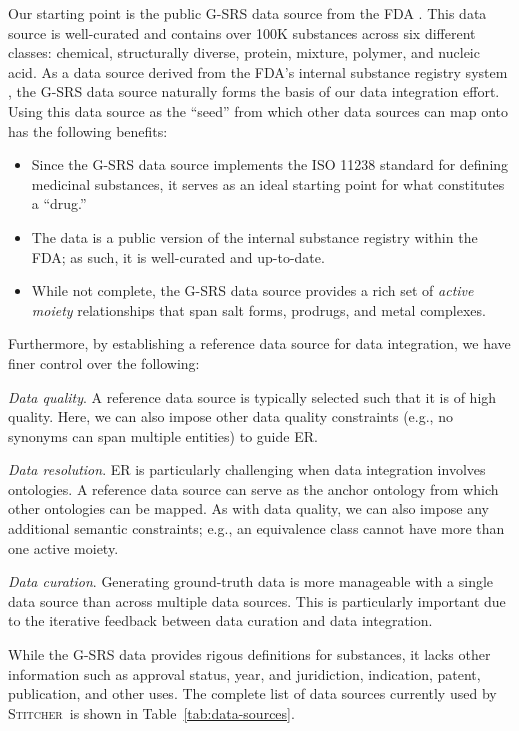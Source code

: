 \documentclass{bmcart}
\newcommand\st{\textsc{Stitcher}}
\begin{document}
Our starting point is the public G-SRS data source from the FDA
\cite{GSRSData}. This data source is well-curated and contains over
100K substances across six different classes: chemical, structurally
diverse, protein, mixture, polymer, and nucleic acid. As 
a data source derived from the FDA's internal substance registry
system \cite{GSRS}, the G-SRS data source naturally forms the basis of
our data integration effort. Using this data source as the ``seed''
from which other data sources can map onto has the following benefits:
\begin{itemize}
\item Since the G-SRS data source implements the ISO 11238
  standard \cite{ISO11238} for defining medicinal substances, it serves
  as an ideal starting point for what constitutes a ``drug.''
\item The data is a public version of the internal substance registry
  within the FDA; as such, it is well-curated and up-to-date.
\item While not complete, the G-SRS data source provides a rich set of
  \emph{active moiety} relationships that span salt forms,
  prodrugs, and metal complexes.
\end{itemize}
Furthermore, by establishing a reference data source
for data integration, we have finer control over the following: 
\begin{description}
\item{\emph{Data quality}.} A reference data source is typically
selected such that it is of high quality. Here, we can also impose
other data quality constraints (e.g., no synonyms can span multiple
entities) to guide ER. 
\item{\emph{Data resolution}.} ER is particularly
challenging when data integration involves ontologies. A reference
data source can serve as the anchor ontology from which other
ontologies can be mapped. As with data quality, we can also impose any
additional semantic constraints; e.g., an equivalence class cannot
have more than one active moiety. 
\item{\emph{Data curation}.} Generating ground-truth data is more
manageable with a single data source than across multiple data sources.
This is particularly important due to the iterative feedback between
data curation and data integration. 
\end{description}
While the G-SRS data provides rigous definitions for substances, it
lacks other information such as approval status, year, and juridiction,
indication, patent, publication, and other uses. The complete list of
data sources currently used by \st\ is shown in 
Table~\ref{tab:data-sources}.
\end{document}
